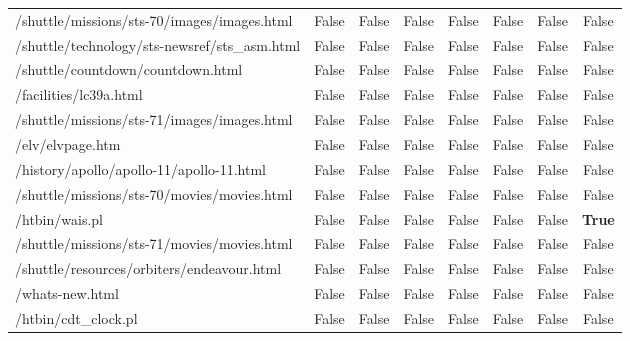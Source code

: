 \documentclass{classrep}
\begin{document}
\begin{table}[H]
{\begin{tabular}{@{}lccccccc@{}}
    /shuttle/missions/sts-70/images/images.html & False & False & False & False & False & False & False \\
    /shuttle/technology/sts-newsref/sts\_asm.html & False & False & False & False & False & False & False \\
    /shuttle/countdown/countdown.html & False & False & False & False & False & False & False \\
    /facilities/lc39a.html & False & False & False & False & False & False & False \\
    /shuttle/missions/sts-71/images/images.html & False & False & False & False & False & False & False \\
    /elv/elvpage.htm & False & False & False & False & False & False & False \\
    /history/apollo/apollo-11/apollo-11.html & False & False & False & False & False & False & False \\
    /shuttle/missions/sts-70/movies/movies.html & False & False & False & False & False & False & False \\
    /htbin/wais.pl & False & False & False & False & False & False & \textbf{True} \\
    /shuttle/missions/sts-71/movies/movies.html & False & False & False & False & False & False & False \\
    /shuttle/resources/orbiters/endeavour.html & False & False & False & False & False & False & False \\
    /whats-new.html & False & False & False & False & False & False & False \\
    /htbin/cdt\_clock.pl & False & False & False & False & False & False & False \\ \bottomrule
    \end{tabular}%
    }
    \end{table}
    
    \begin{table}[H]
    \centering
    \caption{Przypisanie obserwacji dla 6 klastrów z flagami stron podczas analizy sesji}
    \label{tab:ses_6clusters_pages_sum}
    \end{table}
    
\end{document}
